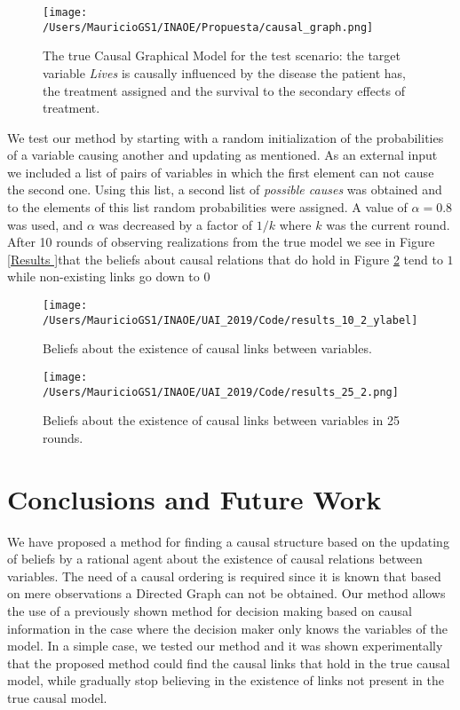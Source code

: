 \documentclass[letterpaper]{article}
\begin{document}
\begin{figure}[ht]
\vskip 0.2in
\begin{center}
\centerline{\texttt{[image: /Users/MauricioGS1/INAOE/Propuesta/causal\_graph.png]}}
\caption{The true Causal Graphical Model for the test scenario: the target variable \textit{Lives} is causally influenced by the disease the patient has, the treatment assigned and the survival to the secondary effects of treatment.}
\label{causal_model}
\end{center}
\vskip -0.2in
\end{figure}

We test our method by starting with a random initialization of the probabilities of a variable causing another and updating as mentioned. As an external input we included a list of pairs of variables in which the first element can not cause the second one. Using this list, a second list of \textit{possible causes} was obtained and to the elements of this list random probabilities were assigned. A value of $\alpha=0.8$ was used, and $\alpha$ was decreased by a factor of $1/k$ where $k$ was the current round. After 10 rounds of observing realizations from the true model we see in Figure \ref{Results }that the beliefs about causal relations that do hold in Figure \ref{10_rounds} tend to $1$ while non-existing links go down to $0$ 

\begin{figure}[ht]
\vskip 0.2in
\begin{center}
\centerline{\texttt{[image: /Users/MauricioGS1/INAOE/UAI\_2019/Code/results\_10\_2\_ylabel]}}
\caption{Beliefs about the existence of causal links between variables.}
\label{10_rounds}
\end{center}
\vskip -0.2in
\end{figure}

\begin{figure}[ht]
\vskip 0.2in
\begin{center}
\centerline{\texttt{[image: /Users/MauricioGS1/INAOE/UAI\_2019/Code/results\_25\_2.png]}}
\caption{Beliefs about the existence of causal links between variables in 25 rounds.}
\label{25_rounds}
\end{center}
\vskip -0.2in
\end{figure}

\section{Conclusions and Future Work}
We have proposed a method for finding a causal structure based on the updating of beliefs by a rational agent about the existence of causal relations between variables. The need of a causal ordering is required since it is known that based on mere observations a Directed Graph can not be obtained. Our method allows the use of a previously shown method for decision making based on causal information in the case where the decision maker only knows the variables of the model. In a simple case, we tested our method and it was shown experimentally that the proposed method could find the causal links that hold in the true causal model, while gradually stop believing in the existence of links not present in the true causal model.
\end{document}
